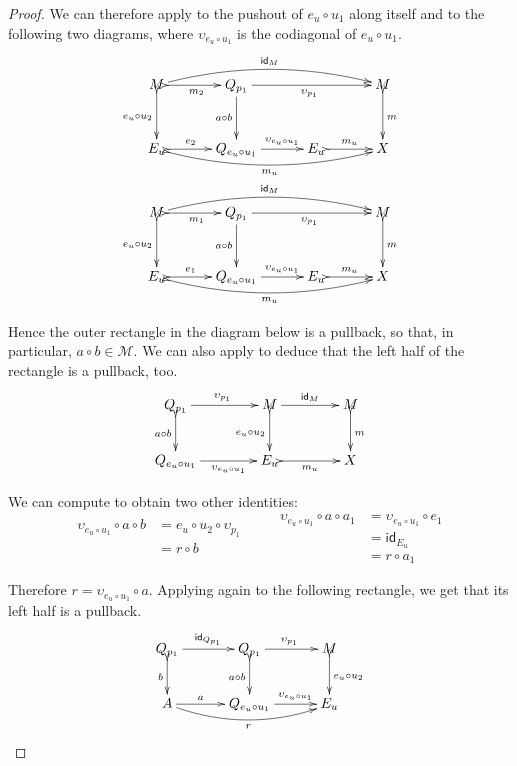 \documentclass[a4paper]{article}
\newcommand{\id}[1]{\mathsf{id}_{#1}}
\theoremstyle{definition}
\begin{document}
\begin{proof}
	We can therefore apply  to the pushout of $e_u\circ u_1$ along itself and to the following two diagrams, where $\upsilon_{e_u\circ u_1}$ is the codiagonal of $e_u\circ u_1$.
	\[
	\xymatrix@C=30pt@R=30pt{ M \ar@/^.4cm/[rrr]^{\id{M}} \ar@{>->}[d]_{e_u\circ u_2}\ar@{>->}[r]_{m_2} & Q_{p_1} \ar[rr]_{\upsilon_{p_1}} \ar[d]_{a\circ b} && M\ar@{>->}[d]^{m} \\ E_u \ar@{>->}@/_.4cm/[rrr]_{m_u}\ar@{>->}[r]^-{e_2} & Q_{e_u\circ u_1} \ar[r]^-{\upsilon_{e_u\circ u_1}} &E_u \ar@{>->}[r]^{m_u} &X\\ 
	M\ar@/^.4cm/[rrr]^{\id{M}} \ar@{>->}[d]_{e_u\circ u_2} \ar@{>->}[r]_{m_1}  & Q_{p_1} \ar[rr]_{\upsilon_{p_1}} \ar[d]_{a\circ b}  && M \ar@{>->}[d]^{m}\\ E_u \ar@{>->}@/_.4cm/[rrr]_{m_u}\ar@{>->}[r]^-{e_1}& Q_{e_u\circ u_1} \ar[r]^-{\upsilon_{e_u\circ u_1}} & E_u \ar@{>->}[r]^{m_u} &X }\]
	
	Hence the outer rectangle in the diagram below is a pullback, so that, in particular, $a\circ b\in \mathcal{M}$. We can also apply  to deduce that the left half of the rectangle  is a pullback, too. 
	\[\xymatrix@C=40pt{Q_{p_1} \ar[r]^{\upsilon_{p_1}} \ar@{>->}[d]_{a\circ b} &M \ar[r]^{\id{M}} \ar@{>->}[d]_{e_u\circ u_2}& M \ar@{>->}[d]^{m}\\ Q_{e_u\circ u_1} \ar[r]_-{\upsilon_{e_u\circ u_1}} & E_u \ar@{>->}[r]_{m_u}& X}\]
	
	We can compute to obtain two other identities:
	\[\begin{split}
		\upsilon_{e_u\circ u_1}\circ a\circ b & = e_u\circ u_2\circ \upsilon_{p_1}\\&= r\circ b\\&
	\end{split}\qquad \begin{split}
		\upsilon_{e_u\circ u_1}\circ a\circ a_1 &= \upsilon_{e_u\circ u_1}\circ e_1\\&= \id{E_u}\\&=r\circ a_1
	\end{split}\]
	
	Therefore $r= \upsilon_{e_u\circ u_1}\circ a$. Applying again  to the following rectangle, we get that its left half is a pullback.
	\[ \xymatrix@C=30pt{Q_{p_1} \ar@{>->}[d]_b \ar[r]^{\id{Q_{p_1}}} & Q_{p_1}  \ar@{>->}[d]_{a\circ b}\ar[r]^{\upsilon_{p_1}}& M \ar@{>->}[d]^{e_u\circ u_2}\\ A \ar@/_.4cm/[rr]_{r}\ar[r]^-a&Q_{e_u\circ u_1} \ar[r]^-{\upsilon_{e_u\circ u_1}}& E_u }\]
	

\end{proof}
\end{document}
